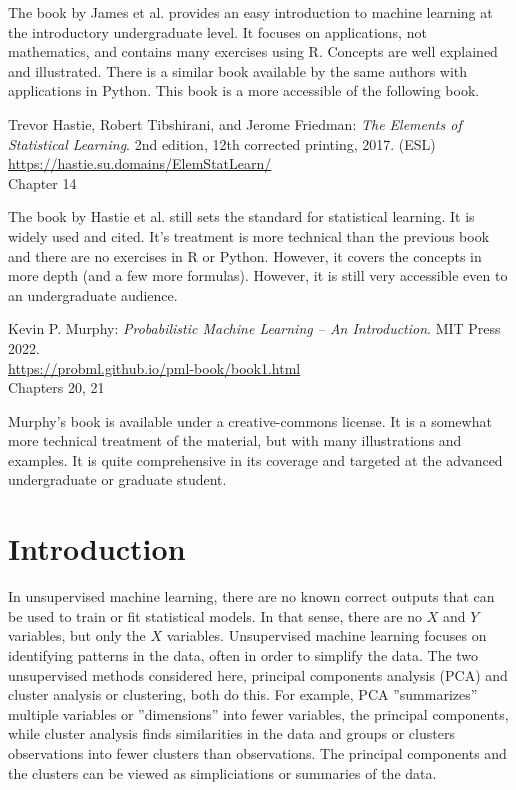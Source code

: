 The book by James et al. provides an easy introduction to machine learning at the introductory undergraduate level. It focuses on applications, not mathematics, and contains many exercises using R. Concepts are well explained and illustrated. There is a similar book available by the same authors with applications in Python. This book is a more accessible of the following book.

\begin{tcolorbox}[colback=alert]
Trevor Hastie, Robert Tibshirani, and Jerome Friedman: \emph{The Elements of Statistical Learning}. 2nd edition, 12th corrected printing, 2017. (ESL) \\
\vspace{1mm}
\url{https://hastie.su.domains/ElemStatLearn/} \\
\vspace{1mm}
Chapter 14
\end{tcolorbox}

The book by Hastie et al. still sets the standard for statistical learning. It is widely used and cited. It's treatment is more technical than the previous book and there are no exercises in R or Python. However, it covers the concepts in more depth (and a few more formulas). However, it is still very accessible even to an undergraduate audience.

\begin{tcolorbox}[colback=alert]
Kevin P. Murphy: \emph{Probabilistic Machine Learning -- An Introduction}. MIT Press 2022. \\
\vspace{1mm}
\url{https://probml.github.io/pml-book/book1.html} \\
\vspace{1mm}
Chapters 20, 21
\end{tcolorbox}

Murphy's book is available under a creative-commons license. It is a somewhat more technical treatment of the material, but with many illustrations and examples. It is quite comprehensive in its coverage and targeted at the advanced undergraduate or graduate student. 

\section{Introduction}

In unsupervised machine learning, there are no known correct outputs that can be used to train or fit statistical models. In that sense, there are no $X$ and $Y$ variables, but only the $X$ variables. Unsupervised machine learning focuses on identifying patterns in the data, often in order to simplify the data. The two unsupervised methods considered here, principal components analysis (PCA) and cluster analysis or clustering, both do this. For example, PCA ''summarizes'' multiple variables or ''dimensions'' into fewer variables, the principal components, while cluster analysis finds similarities in the data and groups or clusters observations into fewer clusters than observations. The principal components and the clusters can be viewed as simpliciations or summaries of the data. 

